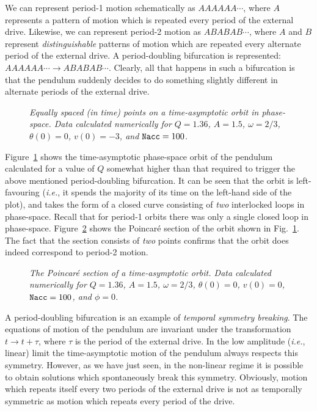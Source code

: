 We can represent period-1 motion schematically as $AAAAAA\cdots$, where $A$ represents a pattern
of motion which is repeated every period of the external drive. Likewise, we can represent
period-2 motion as $ABABAB\cdots$, where $A$ and $B$ represent {\em distinguishable}  patterns of motion
which are repeated every alternate period of the external drive. A period-doubling
bifurcation is represented: $AAAAAA\cdots\rightarrow ABABAB\cdots$. Clearly, all that happens
in such a bifurcation is that the pendulum suddenly decides to do something slightly different in
alternate periods of the external drive.

\begin{figure}
\epsfysize=3in
\centerline{}
\caption{\em Equally spaced (in time) points on a time-asymptotic orbit in phase-space. Data
calculated numerically for $Q=1.36$, $A=1.5$, $\omega=2/3$, $\theta(0)=0$,
$v(0)=-3$, and  ${\tt Nacc} = 100$. }\label{f30}
\end{figure}

Figure~\ref{f30} shows the time-asymptotic phase-space orbit of the pendulum calculated for a
value of $Q$ somewhat higher than that required to trigger the above mentioned period-doubling bifurcation. It can
be seen that the orbit is left-favouring ({\em i.e.}, it spends the majority of its time on
the left-hand side of the plot), and takes the form of a closed curve consisting of
{\em two} interlocked loops in phase-space.
Recall that for period-1 orbits there was only a single closed  loop in phase-space.
Figure~\ref{f31} shows the Poincar\'{e} section of the orbit shown in Fig.~\ref{f30}. 
The fact that the section consists
of {\em two} points confirms that the orbit does indeed correspond to period-2 motion.

\begin{figure}
\epsfysize=3in
\centerline{}
\caption{\em The Poincar\'{e} section of a time-asymptotic
orbit. Data calculated numerically for $Q=1.36$, $A=1.5$, $\omega=2/3$, $\theta(0)=0$,
$v(0)=0$, ${\tt Nacc} = 100$, and $\phi=0$. }\label{f31}
\end{figure}

A period-doubling bifurcation is an example of {\em temporal symmetry breaking}. The equations of
motion of the pendulum are invariant under the transformation $t\rightarrow t+\tau$, where
$\tau$ is the period of the external drive. In the low amplitude ({\em i.e.}, linear) limit 
the time-asymptotic motion of the pendulum always respects this symmetry. However, as we have just seen, in the
non-linear regime it is possible to obtain solutions which spontaneously break this  symmetry.
Obviously, motion which repeats itself every two periods of the external drive is not
as temporally symmetric as motion which repeats every period of the drive. 

